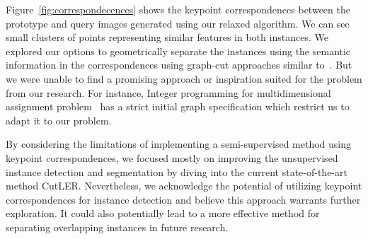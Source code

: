 Figure~\ref{fig:correspondecences} shows the keypoint correspondences between the prototype and query images generated using our relaxed algorithm. We can see small clusters of points representing similar features in both instances. We explored our options to geometrically separate the instances using the semantic information in the correspondences using graph-cut approaches similar to~\cite{wang2022tokencut, sarlin2020supergluelearningfeaturematching}. But we were unable to find a promising approach or inspiration suited for the problem from our research. For instance, Integer programming for multidimensional assignment problem~\cite{WALTEROS2014553} has a strict initial graph specification which restrict us to adapt it to our problem.

By considering the limitations of implementing a semi-supervised method using keypoint correspondences, we focused mostly on improving the unsupervised instance detection and segmentation by diving into the current state-of-the-art method CutLER. Nevertheless, we acknowledge the potential of utilizing keypoint correspondences for instance detection and believe this approach warrants further exploration. It could also potentially lead to a more effective method for separating overlapping instances in future research.



